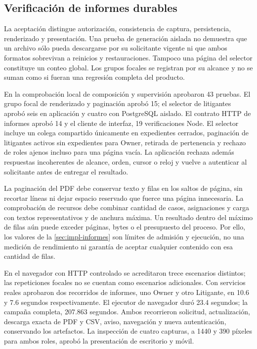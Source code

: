 \subsection{Verificación de informes durables}\label{sec:pruebas-informes}

La aceptación distingue autorización, consistencia de captura, persistencia,
renderizado y presentación. Una prueba de generación aislada no demuestra que
un archivo sólo pueda descargarse por su solicitante vigente ni que ambos
formatos sobrevivan a reinicios y restauraciones. Tampoco una página del
selector constituye un conteo global. Los grupos focales se registran por
su alcance y no se suman como si fueran una regresión completa del producto.

En la comprobación local de composición y supervisión aprobaron 43 pruebas.
El grupo focal de renderizado y paginación aprobó 15; el selector de litigantes
aprobó seis en aplicación y cuatro con PostgreSQL aislado. El contrato HTTP de
informes aprobó 14 y el cliente de interfaz, 19 verificaciones Node. El selector
incluye un colega compartido únicamente en expedientes cerrados, paginación de
litigantes activos sin expedientes para Owner, retirada de pertenencia y rechazo
de roles ajenos incluso para una página vacía. La aplicación rechaza además
respuestas incoherentes de alcance, orden, cursor o reloj y vuelve a autenticar
al solicitante antes de entregar el resultado.

La paginación del PDF debe conservar texto y filas en los saltos de página, sin
recortar líneas ni dejar espacio reservado que fuerce una página innecesaria.
La comprobación de recursos debe combinar cantidad de casos, asignaciones y
carga con textos representativos y de anchura máxima. Un resultado dentro del
máximo de filas aún puede exceder páginas, bytes o el presupuesto del proceso.
Por ello, los valores de la \cref{sec:impl-informes} son límites de admisión y
ejecución, no una medición de rendimiento ni garantía de aceptar cualquier
contenido con esa cantidad de filas.

En el navegador con HTTP controlado se acreditaron trece escenarios distintos;
las repeticiones focales no se cuentan como escenarios adicionales. Con servicios
reales aprobaron dos recorridos de informes, uno Owner y otro Litigante, en
10.6 y 7.6 segundos respectivamente. El ejecutor de navegador duró 23.4 segundos;
la campaña completa, 207.863 segundos. Ambos recorrieron solicitud, actualización,
descarga exacta de PDF y CSV, aviso, navegación y nueva autenticación, conservando
los artefactos. La inspección de cuatro capturas, a 1440 y 390 píxeles para ambos
roles, aprobó la presentación de escritorio y móvil.

